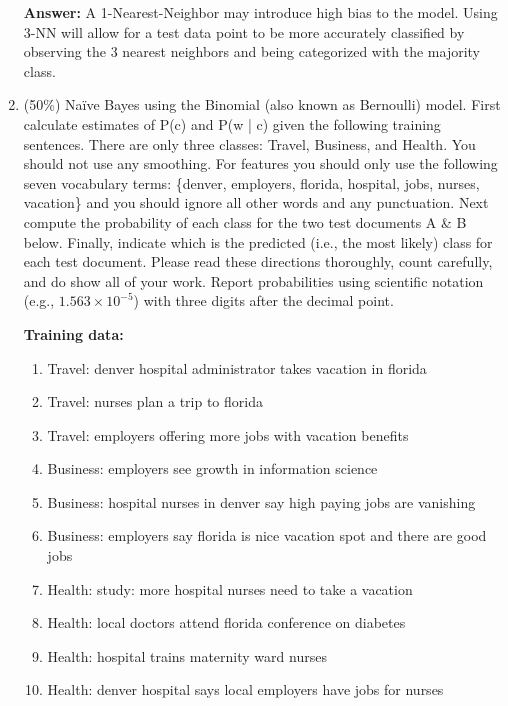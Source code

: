 \documentclass[11pt]{article}
\begin{document}
\begin{enumerate}
        \textbf{Answer:} A 1-Nearest-Neighbor may introduce high bias to the model. Using 3-NN will allow for a test data point to be more accurately classified by observing the 3 nearest neighbors and being categorized with the majority class.

        \item (50\%) Naïve Bayes using the Binomial (also known as Bernoulli) model. First calculate estimates of P(c) and P(w | c) given the following training sentences. There are only three classes: Travel, Business, and Health. You should not use any smoothing. For features you should only use the following seven vocabulary terms: \{denver, employers, florida, hospital, jobs, nurses, vacation\} and you should ignore all other words and any punctuation. Next compute the probability of each class for the two test documents A \& B below. Finally, indicate which is the predicted (i.e., the most likely) class for each test document. Please read these directions thoroughly, count carefully, and do show all of your work. Report probabilities using scientific notation (e.g., $1.563 \times 10^{-5}$) with three digits after the decimal point.

        \textbf{Training data:}
        \begin{enumerate}[1)]
            \item Travel: denver hospital administrator takes vacation in florida
            \item Travel: nurses plan a trip to florida
            \item Travel: employers offering more jobs with vacation benefits
            \item Business: employers see growth in information science
            \item Business: hospital nurses in denver say high paying jobs are vanishing
            \item Business: employers say florida is nice vacation spot and there are good jobs
            \item Health: study: more hospital nurses need to take a vacation
            \item Health: local doctors attend florida conference on diabetes
            \item Health: hospital trains maternity ward nurses
            \item Health: denver hospital says local employers have jobs for nurses
        \end{enumerate}


\end{enumerate}
\end{document}
